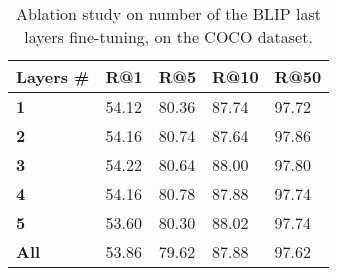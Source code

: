\begin{table}[ht]
\centering
\caption{Ablation study on number of the BLIP last layers fine-tuning, on the COCO dataset. }
\label{tab:ablations_lastlayers_ft}
\begin{tabular}{@{}lllll@{}}
\toprule
 Layers \# & R@1 & R@5 & R@10 & R@50 \\ \midrule
{\bf 1} & 54.12 & 80.36 & 87.74 & 97.72 \\
{\bf 2} & 54.16 & 80.74 & 87.64 & 97.86 \\
{\bf 3} & 54.22 & 80.64 & 88.00 & 97.80 \\
{\bf 4} & 54.16 & 80.78 & 87.88 & 97.74 \\
{\bf 5} & 53.60 & 80.30 & 88.02 & 97.74 \\
{\bf All} & 53.86 & 79.62 & 87.88 & 97.62 \\
 \bottomrule
\end{tabular}
\end{table}
